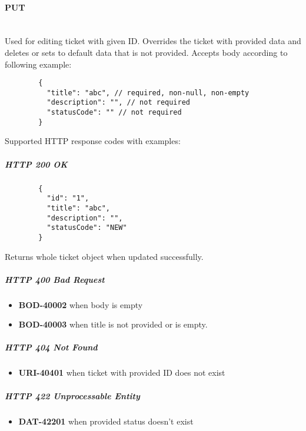 \documentclass[a4paper]{article}
\newcommand{\newLineParagraph}[1]{\paragraph{#1}\mbox{}\\}
\begin{document}
    \newLineParagraph{PUT}
    Used for editing ticket with given ID. Overrides the ticket with provided data and deletes or sets to default data that is not provided. Accepts body according to following example:
    \begin{verbatim}
        {
          "title": "abc", // required, non-null, non-empty
          "description": "", // not required
          "statusCode": "" // not required
        }
    \end{verbatim}
    Supported HTTP response codes with examples:
    \subparagraph{HTTP 200 OK}
    \begin{verbatim}
        {
          "id": "1",
          "title": "abc",
          "description": "",
          "statusCode": "NEW"
        }
    \end{verbatim}
    Returns whole ticket object when updated successfully.
    \subparagraph{HTTP 400 Bad Request}
    \begin{itemize}
        \item \textbf{BOD-40002} when body is empty
        \item \textbf{BOD-40003} when title is not provided or is empty.
    \end{itemize}
    \subparagraph{HTTP 404 Not Found}
    \begin{itemize}
        \item \textbf{URI-40401} when ticket with provided ID does not exist
    \end{itemize}
    \subparagraph{HTTP 422 Unprocessable Entity}
    \begin{itemize}
        \item \textbf{DAT-42201} when provided status doesn't exist
    \end{itemize}
\end{document}
